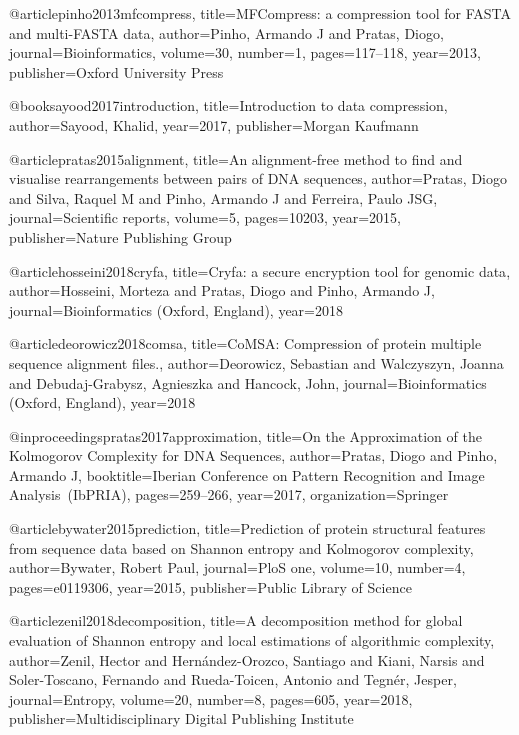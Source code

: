 @article{pinho2013mfcompress,
  title={{MFCompress: a compression tool for FASTA and multi-FASTA data}},
  author={Pinho, Armando J and Pratas, Diogo},
  journal={Bioinformatics},
  volume={30},
  number={1},
  pages={117--118},
  year={2013},
  publisher={Oxford University Press}
}

@book{sayood2017introduction,
  title={Introduction to data compression},
  author={Sayood, Khalid},
  year={2017},
  publisher={Morgan Kaufmann}
}

@article{pratas2015alignment,
  title={{An alignment-free method to find and visualise rearrangements between pairs of DNA sequences}},
  author={Pratas, Diogo and Silva, Raquel M and Pinho, Armando J and Ferreira, Paulo JSG},
  journal={Scientific reports},
  volume={5},
  pages={10203},
  year={2015},
  publisher={Nature Publishing Group}
}

@article{hosseini2018cryfa,
	title={Cryfa: a secure encryption tool for genomic data},
	author={Hosseini, Morteza and Pratas, Diogo and Pinho, Armando J},
	journal={Bioinformatics (Oxford, England)},
	year={2018}
}

@article{deorowicz2018comsa,
	title={CoMSA: Compression of protein multiple sequence alignment files.},
	author={Deorowicz, Sebastian and Walczyszyn, Joanna and Debudaj-Grabysz, Agnieszka and Hancock, John},
	journal={Bioinformatics (Oxford, England)},
	year={2018}
}

@inproceedings{pratas2017approximation,
	title={On the Approximation of the {Kolmogorov} Complexity for {DNA} Sequences},
	author={Pratas, Diogo and Pinho, Armando J},
	booktitle={Iberian Conference on Pattern Recognition and Image Analysis~(IbPRIA)},
	pages={259--266},
	year={2017},
	organization={Springer}
}

@article{bywater2015prediction,
  title={Prediction of protein structural features from sequence data based on {Shannon} entropy and {Kolmogorov} complexity},
  author={Bywater, Robert Paul},
  journal={PloS one},
  volume={10},
  number={4},
  pages={e0119306},
  year={2015},
  publisher={Public Library of Science}
}

@article{zenil2018decomposition,
  title={A decomposition method for global evaluation of {Shannon} entropy and local estimations of algorithmic complexity},
  author={Zenil, Hector and Hern{\'a}ndez-Orozco, Santiago and Kiani, Narsis and Soler-Toscano, Fernando and Rueda-Toicen, Antonio and Tegn{\'e}r, Jesper},
  journal={Entropy},
  volume={20},
  number={8},
  pages={605},
  year={2018},
  publisher={Multidisciplinary Digital Publishing Institute}
}

